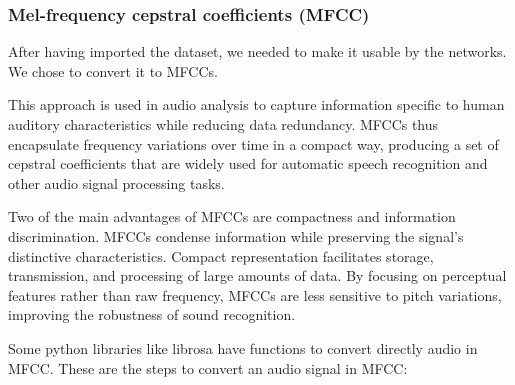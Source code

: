 \documentclass[11pt]{article}
\begin{document}
\subsubsection{Mel-frequency cepstral coefficients (MFCC)}

After having imported the dataset, we needed to make it usable by the networks. We chose to convert it to MFCCs.

This approach is used in audio analysis to capture information specific to human auditory characteristics while reducing data redundancy. MFCCs thus encapsulate frequency variations over time in a compact way, producing a set of cepstral coefficients that are widely used for automatic speech recognition and other audio signal processing tasks.

Two of the main advantages of MFCCs are compactness and information discrimination. MFCCs condense information while preserving the signal's distinctive characteristics. Compact representation facilitates storage, transmission, and processing of large amounts of data.
By focusing on perceptual features rather than raw frequency, MFCCs are less sensitive to pitch variations, improving the robustness of sound recognition.

Some python libraries like librosa have functions to convert directly audio in MFCC. These are the steps to convert an audio signal in MFCC:
\end{document}
